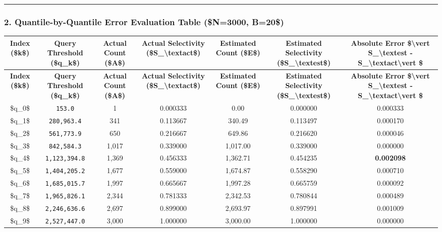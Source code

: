 \documentclass[11pt,a4paper]{article}
\begin{document}
\hrule


\subsubsection{2. Quantile-by-Quantile Error Evaluation Table (\$N=3000, B=20\$)}

{\begingroup
\footnotesize
\setlength{\tabcolsep}{3.5pt}
\begin{xltabular}{\textwidth}{C | C | C | C | C | C | C}
\toprule
\textbf{Index (\$k\$)} & \textbf{Query Threshold (\$q\_k\$)} & \textbf{Actual Count (\$A\$)} & \textbf{Actual Selectivity (\$S\_{\textbackslash{}text{act}}\$)} & \textbf{Estimated Count (\$E\$)} & \textbf{Estimated Selectivity (\$S\_{\textbackslash{}text{est}}\$)} & \textbf{Absolute Error \$\textbackslash{}vert S\_{\textbackslash{}text{est}} - S\_{\textbackslash{}text{act}}\textbackslash{}vert \$} \\
\midrule
\endfirsthead
\toprule
\textbf{Index (\$k\$)} & \textbf{Query Threshold (\$q\_k\$)} & \textbf{Actual Count (\$A\$)} & \textbf{Actual Selectivity (\$S\_{\textbackslash{}text{act}}\$)} & \textbf{Estimated Count (\$E\$)} & \textbf{Estimated Selectivity (\$S\_{\textbackslash{}text{est}}\$)} & \textbf{Absolute Error \$\textbackslash{}vert S\_{\textbackslash{}text{est}} - S\_{\textbackslash{}text{act}}\textbackslash{}vert \$} \\
\midrule
\endfirsthead
\endhead
\bottomrule
\endfoot
\bottomrule
\endlastfoot
\$q\_0\$ & \texttt{153.0} & 1 & 0.000333 & 0.00 & 0.000000 & 0.000333 \\
\$q\_1\$ & \texttt{280,963.4} & 341 & 0.113667 & 340.49 & 0.113497 & 0.000170 \\
\$q\_2\$ & \texttt{561,773.9} & 650 & 0.216667 & 649.86 & 0.216620 & 0.000046 \\
\$q\_3\$ & \texttt{842,584.3} & 1,017 & 0.339000 & 1,017.00 & 0.339000 & 0.000000 \\
\$q\_4\$ & \texttt{1,123,394.8} & 1,369 & 0.456333 & 1,362.71 & 0.454235 & \textbf{0.002098} \\
\$q\_5\$ & \texttt{1,404,205.2} & 1,677 & 0.559000 & 1,674.87 & 0.558290 & 0.000710 \\
\$q\_6\$ & \texttt{1,685,015.7} & 1,997 & 0.665667 & 1,997.28 & 0.665759 & 0.000092 \\
\$q\_7\$ & \texttt{1,965,826.1} & 2,344 & 0.781333 & 2,342.53 & 0.780844 & 0.000489 \\
\$q\_8\$ & \texttt{2,246,636.6} & 2,697 & 0.899000 & 2,693.97 & 0.897991 & 0.001009 \\
\$q\_9\$ & \texttt{2,527,447.0} & 3,000 & 1.000000 & 3,000.00 & 1.000000 & 0.000000 \\
\end{xltabular}
\endgroup}
\end{document}
